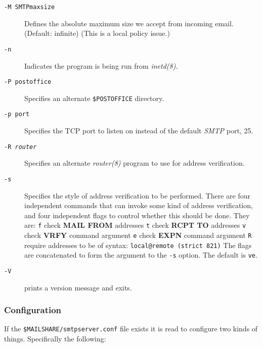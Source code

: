 \begin{description}
\item[{\tt -M SMTPmaxsize}] \mbox{}

Defines the absolute maximum size we accept from incoming email. 
(Default: infinite) (This is a local policy issue.)

\item[{\tt -n}] \mbox{}

Indicates the program is being run from {\em inetd(8)\/}.

\item[{\tt -P postoffice}] \mbox{}

Specifies an alternate {\tt \$POSTOFFICE} directory.

\item[{\tt -p port}] \mbox{}

Specifies the TCP port to listen on instead of the default {\em SMTP\/} port, 25.

\item[{\tt -R {\em router\/}}] \mbox{}

Specifies an alternate {\em router(8)\/} program to use for address verification.

\item[{\tt -s}] \mbox{}

Specifies the style of address verification to be performed. There are four independent commands 
that can invoke some kind of address verification, and four independent flags to control whether this should be done. 
They are:
{\tt f} check {\bf MAIL FROM} addresses
{\tt t} check {\bf RCPT TO} addresses
{\tt v} check {\bf VRFY} command argument
{\tt e} check {\bf EXPN} command argument
{\tt R} require addresses to be of syntax: {\tt local@remote (strict 821)}
The flags are concatenated to form the argument to the {\tt -s} option. 
The default is {\tt ve}.

\item[{\tt -V}] \mbox{}

prints a version message and exits.

\end{description}





\subsubsection{Configuration}



If the {\tt \$MAILSHARE/smtpserver.conf} file exists it is read 
to configure two kinds of things. Specifically the following:

